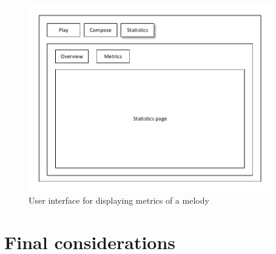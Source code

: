 \begin{figure}
\centerline{\includegraphics[width=400px]{../images/ui_metrics.pdf}}
\caption{User interface for displaying metrics of a melody}
\label{ims:uimetrics}
\end{figure}




\chapter{Final considerations}